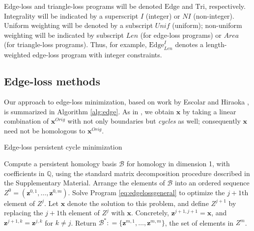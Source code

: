 \documentclass[utf8]{formatting_stuff/frontiersFPHY}
\newcommand{\Q}{\mathbb{Q}}
\newcommand{\originalrep}{\mathbf{x}^{Orig}}
\newcommand{\optimalrep}{\mathbf{x}}
\newcommand{\hcyclebasis}{\mathcal B}
\newcommand{\Edge}{\mathrm{Edge}}
\newcommand{\Tri}{\mathrm{Tri}}
\newcommand{\obasis}{Z}
\newcommand{\obasisel}{\mathbf{z}}
\theoremstyle{plain}
\theoremstyle{definition}
\begin{document}
Edge-loss and triangle-loss programs will be denoted $\Edge$ and $\Tri$, respectively.  Integrality will be indicated by a superscript $I$ (integer) or $NI$ (non-integer).  Uniform weighting will be denoted by a subscript $Unif$ (uniform); non-uniform weighting will be indicated by subscript $Len$ (for edge-loss programs) or $Area$ (for triangle-loss programs).  Thus, for example, $\Edge^{I}_{Len}$ denotes a length-weighted edge-loss program with integer constraints.

\subsection{Edge-loss methods}
\label{sec:edgelossmethods}

 
Our approach to edge-loss minimization, based on work by Escolar and Hiraoka \cite{Escolar2016}, is summarized in Algorithm \ref{alg:edge}.  As in \cite{Escolar2016}, we obtain $\optimalrep$  by taking a linear combination of $\originalrep$ with not only boundaries but \emph{cycles} as well; consequently $\optimalrep$ need not be homologous to $\originalrep$.  
\begin{algorithm}
\caption{Edge-loss persistent cycle minimization}
\label{alg:edge}
\begin{algorithmic}[1]
\STATE Compute a persistent homology basis $\hcyclebasis$ for homology in dimension 1, with coefficients in $\Q$,  using the standard matrix decomposition procedure described in the Supplementary Material. Arrange the elements of $\hcyclebasis$ into an ordered sequence $\obasis^0 = (\obasisel^{0,1}, \ldots, \obasisel^{0,m})$.
\STATE Solve Program \eqref{eq:edgelossgeneral} to optimize the $j+1$th element of $\obasis^{j}$.  Let $\optimalrep$ denote the solution to this problem, and define $\obasis^{j+1}$ by replacing the $j+1$th element of $\obasis^{j}$ with $\optimalrep$.  Concretely, $\obasisel^{j+1,j+1} = \optimalrep$, and $\obasisel^{j+1,k} = \obasisel^{j,k}$ for $k \neq j$.
\ENDFOR
\STATE Return $\hcyclebasis^*: = \{\obasisel^{m,1}, \ldots, \obasisel^{m,m}\}$, the set of elements in $\obasis^m$.
\end{algorithmic}
\end{algorithm}
\end{document}
